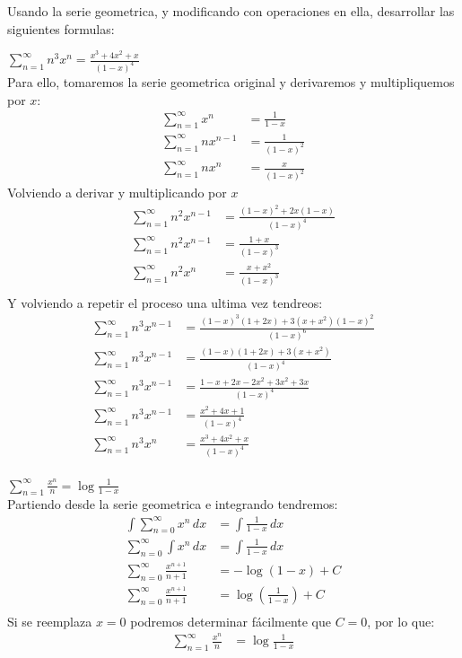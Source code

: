 \documentclass[../main.tex]{subfiles}
\begin{document}
Usando la serie geometrica, y modificando con operaciones en ella, desarrollar las siguientes formulas:

\question $\sum\limits_{n = 1}^\infty n^3x^n = \frac{x^3+4x^2+x}{(1-x)^4}$\\

Para ello, tomaremos la serie geometrica original y derivaremos y multipliquemos por $x$:
\begin{align*}
    \sum_{n = 1}^\infty x^n &= \frac{1}{1-x}\\
    \sum_{n = 1}^\infty nx^{n-1} &= \frac{1}{(1-x)^2}\\
    \sum_{n = 1}^\infty nx^n &= \frac{x}{(1-x)^2}
\end{align*}
Volviendo a derivar y multiplicando por $x$
\begin{align*}
    \sum_{n = 1}^\infty n^2x^{n-1} &= \frac{(1-x)^2 + 2x(1-x)}{(1-x)^4}\\
    \sum_{n = 1}^\infty n^2x^{n-1} &= \frac{1+x}{(1-x)^3}\\
    \sum_{n = 1}^\infty n^2x^n &= \frac{x+x^2}{(1-x)^3}\\
\end{align*}
Y volviendo a repetir el proceso una ultima vez tendreos:
\begin{align*}
    \sum_{n = 1}^\infty n^3x^{n-1} &= \frac{(1-x)^3 (1+2x) + 3(x+x^2)(1-x)^2}{(1-x)^6}\\
    \sum_{n = 1}^\infty n^3x^{n-1} &= \frac{(1-x)(1+2x) + 3(x+x^2)}{(1-x)^4}\\
    \sum_{n = 1}^\infty n^3x^{n-1} &= \frac{1-x+2x-2x^2+3x^2+3x}{(1-x)^4}\\
    \sum_{n = 1}^\infty n^3x^{n-1} &= \frac{x^2+4x+1}{(1-x)^4}\\
    \sum_{n = 1}^\infty n^3x^{n} &= \frac{x^3+4x^2+x}{(1-x)^4}\\
\end{align*}

\question $\sum\limits_{n = 1}^\infty \frac{x^n}{n} = \log \frac{1}{1-x}$\\

Partiendo desde la serie geometrica e integrando tendremos:
\begin{align*}
    \int \sum\limits_{n = 0}^\infty x^n \, dx &= \int \frac{1}{1-x} \, dx\\
    \sum_{n = 0}^\infty \int x^n \, dx &= \int \frac{1}{1-x} \, dx\\
    \sum_{n = 0}^\infty \frac{x^{n+1}}{n+1} &= - \log(1-x) + C\\
    \sum_{n = 0}^\infty \frac{x^{n+1}}{n+1} &= \log\left(\frac{1}{1-x}\right) + C\\
\end{align*}
Si se reemplaza $x = 0$ podremos determinar fácilmente que $C = 0$, por lo que:
\begin{align*}
    \sum_{n = 1}^\infty \frac{x^n}{n} &= \log \frac{1}{1-x}
\end{align*}
\end{document}

